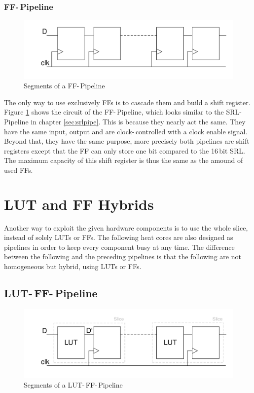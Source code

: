 \subsubsection{FF-\,Pipeline}

\begin{figure}[h]
		\includegraphics[width=\textwidth]{__pics/FFPIPE.pdf}
		\caption{Segments of a FF-\,Pipeline}
		\label{pic:ffpipe}	
	\end{figure} 
	
	
The only way to use exclusively \acp{FF} is to cascade them and build a shift register. Figure \ref{pic:ffpipe} shows the circuit of the \ac{FF}-\,Pipeline, which looks similar to the \ac{SRL}-\,Pipeline in chapter \ref{sec:srlpipe}. This is because they nearly act the same. They have the same input, output and are clock-\,controlled with a clock enable signal. Beyond that, they have the same purpose, more precisely both pipelines are shift registers except that the \ac{FF} can only store one bit compared to the 16\,bit \ac{SRL}. The maximum capacity of this shift register is thus the same as the amound of used \acp{FF}.


\section{LUT and FF Hybrids}

Another way to exploit the given hardware components is to use the whole slice, instead of solely \acp{LUT} or \acp{FF}. The following heat cores are also designed as pipelines in order to keep every component busy at any time. The difference between the following and the preceding pipelines is that the following are not homogeneous but hybrid, using \acp{LUT} or \acp{FF}.

\subsection{LUT-\,FF-\,Pipeline}

\begin{figure}[h]
		\includegraphics[width=\textwidth]{__pics/lutffpipe.pdf}
		\caption{Segments of a LUT-\,FF-\,Pipeline}
		\label{pic:lutffpipe}	
	\end{figure} 


